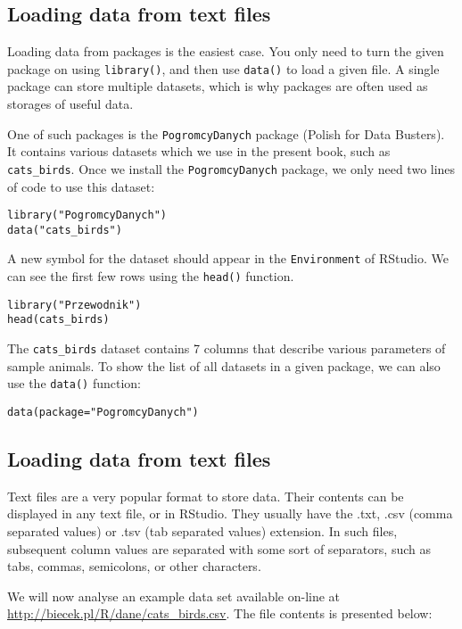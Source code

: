 \documentclass[]{book}
\theoremstyle{definition}
\theoremstyle{definition}
\theoremstyle{definition}
\theoremstyle{remark}
\begin{document}
\subsection{Loading data from text files}\label{part_261}

Loading data from packages is the easiest case. You only need to turn
the given package on using \texttt{library()}, and then use
\texttt{data()} to load a given file. A single package can store
multiple datasets, which is why packages are often used as storages of
useful data.

One of such packages is the \texttt{PogromcyDanych} package (Polish for
Data Busters). It contains various datasets which we use in the present
book, such as \texttt{cats\_birds}. Once we install the
\texttt{PogromcyDanych} package, we only need two lines of code to use
this dataset:

\begin{verbatim}
library("PogromcyDanych")
data("cats_birds")
\end{verbatim}

A new symbol for the dataset should appear in the \texttt{Environment}
of RStudio. We can see the first few rows using the \texttt{head()}
function.

\begin{verbatim}
library("Przewodnik")
head(cats_birds)
\end{verbatim}

The \texttt{cats\_birds} dataset contains 7 columns that describe
various parameters of sample animals. To show the list of all datasets
in a given package, we can also use the \texttt{data()} function:

\begin{verbatim}
data(package="PogromcyDanych")
\end{verbatim}

\subsection{Loading data from text files}\label{part_262}

Text files are a very popular format to store data. Their contents can
be displayed in any text file, or in RStudio. They usually have the
.txt, .csv (comma separated values) or .tsv (tab separated values)
extension. In such files, subsequent column values are separated with
some sort of separators, such as tabs, commas, semicolons, or other
characters.

We will now analyse an example data set available on-line at
\url{http://biecek.pl/R/dane/cats_birds.csv}. The file contents is
presented below:
\end{document}
